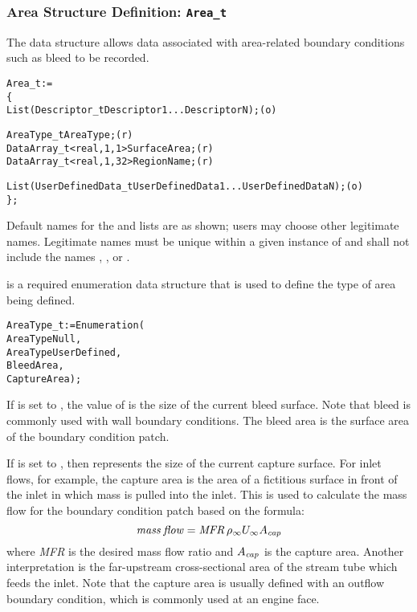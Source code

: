 \subsubsection{Area Structure Definition: \texttt{Area\_t}}
\label{s:Area}

The  data structure allows data associated with
area-related boundary conditions such as bleed to be recorded.

\begin{alltt}
  Area\_t :=
    \{
    List( Descriptor\_t  Descriptor1 ... DescriptorN ) ;                     (o)

    AreaType\_t AreaType ;                                                   (r)
    DataArray\_t<real, 1, 1>  SurfaceArea ;                                  (r)
    DataArray\_t<real, 1, 32> RegionName ;                                   (r)

    List( UserDefinedData\_t UserDefinedData1 ... UserDefinedDataN ) ;       (o)
    \} ;
\end{alltt}

\begin{notes}
\item
 Default names for the  and 
 lists are as shown; users may choose other legitimate names.
 Legitimate names must be unique within a given instance of
  and shall not include the names ,
 , or .
\end{notes}

 is a required enumeration data structure
that is used to define the type of area being defined.
\begin{alltt}
  AreaType\_t := Enumeration(
    AreaTypeNull,
    AreaTypeUserDefined,
    BleedArea,
    CaptureArea ) ;
\end{alltt}

If  is set to , the value of
 is the size of the current bleed surface.
Note that bleed is commonly used with wall boundary conditions.
The bleed area is the surface area of the boundary condition patch.

If  is set to , then
 represents the size of the current capture surface.
For inlet flows, for example, the capture area is the area of a
fictitious surface in front of the inlet in which mass is pulled into
the inlet.
This is used to calculate the mass flow for the boundary condition patch
based on the formula:
$$
{\it mass\:flow} = {\it MFR} \, \rho_{\infty} U_{\infty} A_{\it cap}
$$
where \textit{MFR} is the desired mass flow ratio and
$A_{\it cap}$ is the capture area.
Another interpretation is the far-upstream cross-sectional area of the
stream tube which feeds the inlet.
Note that the capture area is usually defined with an outflow boundary
condition, which is commonly used at an engine face.

